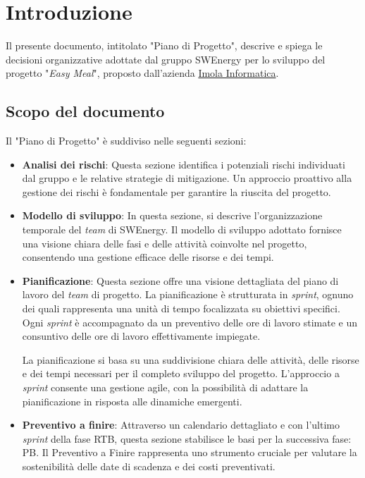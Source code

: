 \section{Introduzione}

Il presente documento, intitolato "Piano di Progetto", descrive e spiega le
decisioni organizzative adottate dal gruppo SWEnergy per lo sviluppo del
progetto "\textit{Easy Meal}", proposto dall'azienda
\href{https://imolainformatica.it/}{Imola Informatica}.

\subsection{Scopo del documento}

Il "Piano di Progetto" è suddiviso nelle seguenti sezioni:

\begin{itemize}
	\item \textbf{Analisi dei rischi}: Questa sezione identifica i potenziali 
		rischi individuati dal gruppo e le relative strategie di mitigazione. 
		Un approccio proattivo alla gestione dei rischi è fondamentale 
		per garantire la riuscita del progetto.

	\item \textbf{Modello di sviluppo}: In questa sezione, si descrive 
		l'organizzazione temporale del \textit{team} di SWEnergy. 
		Il modello di sviluppo adottato fornisce una visione chiara delle fasi 
		e delle attività coinvolte nel progetto, consentendo una gestione 
		efficace delle risorse e dei tempi.

	\item \textbf{Pianificazione}: Questa sezione offre una visione dettagliata 
		del piano di lavoro del \textit{team} di progetto. 
		La pianificazione è strutturata in \textit{sprint}, ognuno dei quali 
		rappresenta una unità di tempo focalizzata su obiettivi specifici. 
		Ogni \textit{sprint} è accompagnato da un preventivo delle ore di lavoro stimate 
		e un consuntivo delle ore di lavoro effettivamente impiegate.

		La pianificazione si basa su una suddivisione chiara delle attività, delle risorse 
		e dei tempi necessari per il completo sviluppo del progetto. 
		L'approccio a \textit{sprint} consente una gestione agile, con la possibilità di 
		adattare la pianificazione in risposta alle dinamiche emergenti.

	\item \textbf{Preventivo a finire}: Attraverso un calendario dettagliato e con l'ultimo 
	\textit{sprint} della fase RTB, questa sezione stabilisce le basi per la successiva fase: PB. 
		Il Preventivo a Finire rappresenta uno strumento cruciale per valutare 
		la sostenibilità delle date di scadenza e dei costi preventivati.


\end{itemize}
